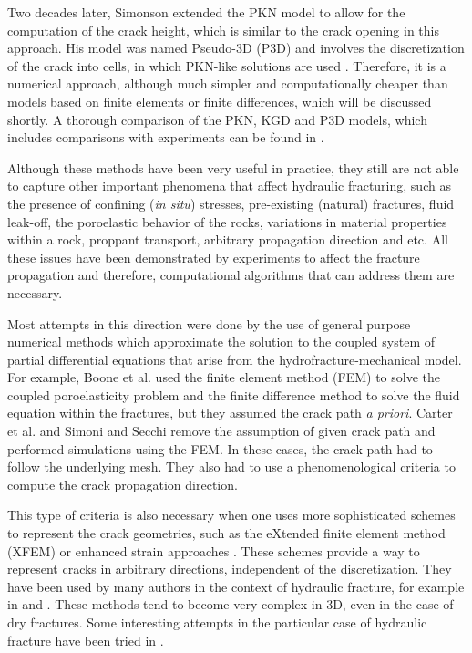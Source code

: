     Two decades later, Simonson \cite{simonson1978containment} extended the PKN model to allow for the computation of the crack height, which is similar to the crack opening in this approach. His model was named Pseudo-3D (P3D) and involves the discretization of the crack into cells, in which PKN-like solutions are used \cite{adachi2007computer}. Therefore, it is a numerical approach, although much simpler and computationally cheaper than models based on finite elements or finite differences, which will be discussed shortly. A thorough comparison of the PKN, KGD and P3D models, which includes comparisons with experiments can be found in \cite{warpinski1994comparison}.

    Although these methods have been very useful in practice, they still are not able to capture other important phenomena that affect hydraulic fracturing, such as the presence of confining (\textit{in situ}) stresses, pre-existing (natural) fractures, fluid leak-off, the poroelastic behavior of the rocks, variations in material properties within a rock, proppant transport, arbitrary propagation direction and etc. All these issues have been demonstrated by experiments to affect the fracture propagation and therefore, computational algorithms that can address them are necessary. 

    Most attempts in this direction were done by the use of general purpose numerical methods which approximate the solution to the coupled system of partial differential equations that arise from the hydrofracture-mechanical model. For example, Boone et al. \cite{boone1990numerical, boone1991simulation} used the finite element method (FEM) to solve the coupled poroelasticity problem and the finite difference method to solve the fluid equation within the fractures, but they assumed the crack path \textit{a priori}. Carter et al. \cite{carter2000simulating} and Simoni and Secchi \cite{simoni2003cohesive} remove the assumption of given crack path and performed simulations using the FEM. In these cases, the crack path had to follow the underlying mesh. They also had to use a phenomenological criteria to compute the crack propagation direction.

    This type of criteria is also necessary when one uses more sophisticated schemes to represent the crack geometries, such as the eXtended finite element method (XFEM)\cite{moes1999finite} or enhanced strain approaches \cite{linder2007finite, borja2008assumed}. These schemes provide a way to represent cracks in arbitrary directions, independent of the discretization. They have been used by many authors in the context of hydraulic fracture, for example in \cite{lecampion2009extended, gordeliy2013coupling, gordeliy2015enrichment} and \cite{mohammadnejad2013extended}. These methods tend to become very complex in 3D, even in the case of dry fractures. Some interesting attempts in the particular case of hydraulic fracture have been tried in \cite{gupta2014simulation, gupta2018coupled}.

